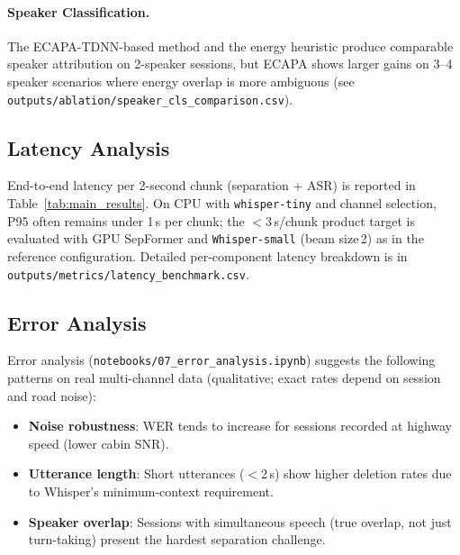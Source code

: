 \paragraph{Speaker Classification.}
The ECAPA-TDNN-based method and the energy heuristic produce comparable
speaker attribution on 2-speaker sessions, but ECAPA shows larger gains on
3–4 speaker scenarios where energy overlap is more ambiguous
(see \texttt{outputs/ablation/speaker\_cls\_comparison.csv}).

\subsection{Latency Analysis}

End-to-end latency per 2-second chunk (separation + ASR) is reported in
Table~\ref{tab:main_results}. On CPU with \texttt{whisper-tiny} and
channel selection, P95 often remains under 1\,s per chunk; the
$<3$\,s/chunk product target is evaluated with GPU SepFormer and
\texttt{Whisper-small} (beam size\,2) as in the reference configuration.
Detailed per-component latency breakdown is in
\texttt{outputs/metrics/latency\_benchmark.csv}.

\subsection{Error Analysis}

Error analysis (\texttt{notebooks/07\_error\_analysis.ipynb}) suggests
the following patterns on real multi-channel data (qualitative; exact
rates depend on session and road noise):
\begin{itemize}
    \item \textbf{Noise robustness}: WER tends to increase for
    sessions recorded at highway speed (lower cabin SNR).
    \item \textbf{Utterance length}: Short utterances ($<$2\,s) show higher
    deletion rates due to Whisper's minimum-context requirement.
    \item \textbf{Speaker overlap}: Sessions with simultaneous speech (true
    overlap, not just turn-taking) present the hardest separation challenge.
\end{itemize}
